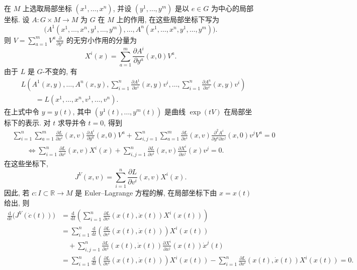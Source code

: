 \begin{RiemannProof}
在 $M$ 上选取局部坐标 $(x^1,\ldots,x^n)$, 并设 $(y^1,\ldots,y^m)$ 是以 $e\in G$ 为中心的局部坐标. 设 $A:G\times M\to M$ 为 $G$ 在 $M$ 上的作用, 在这些局部坐标下写为
\[
  \bigl(A^1(x^1,\ldots,x^n,y^1,\ldots,y^m),\ldots,
         A^n(x^1,\ldots,x^n,y^1,\ldots,y^m)\bigr).
\]
则 $V=\sum_{a=1}^m V^a\frac{\partial}{\partial y^a}$ 的无穷小作用的分量为
\[
  X^i(x)=\sum_{a=1}^m\frac{\partial A^i}{\partial y^a}(x,0)V^a.
\]
由于 $L$ 是 $G$-不变的, 有
\begin{align*}
  &L\left(A^1(x,y),\ldots,A^n(x,y),
    \sum_{i=1}^n\frac{\partial A^1}{\partial x^i}(x,y)v^i,\ldots,
    \sum_{i=1}^n\frac{\partial A^n}{\partial x^i}(x,y)v^i\right)\\
  &\qquad=L(x^1,\ldots,x^n,v^1,\ldots,v^n).
\end{align*}
在上式中令 $y=y(t)$, 其中 $(y^1(t),\ldots,y^m(t))$ 是曲线 $\exp(tV)$ 在局部坐标下的表示. 对 $t$ 求导并令 $t=0$, 得到
\begin{align*}
  &\sum_{i=1}^n\sum_{a=1}^m\frac{\partial L}{\partial x^i}(x,v)
     \frac{\partial A^i}{\partial y^a}(x,0)V^a
  +\sum_{i,j=1}^n\sum_{a=1}^m\frac{\partial L}{\partial v^i}(x,v)
     \frac{\partial^2 A^i}{\partial y^a\partial x^j}(x,0)v^jV^a=0\\
  &\qquad\iff
  \sum_{i=1}^n\frac{\partial L}{\partial x^i}(x,v)X^i(x)
  +\sum_{i,j=1}^n\frac{\partial L}{\partial v^i}(x,v)
     \frac{\partial X^i}{\partial x^j}(x)v^j=0.
\end{align*}
在这些坐标下,
\[
  J^V(x,v)=\sum_{i=1}^n\frac{\partial L}{\partial v^i}(x,v)X^i(x).
\]
因此, 若 $c:I\subset\mathbb{R}\to M$ 是 Euler–Lagrange 方程的解, 在局部坐标下由 $x=x(t)$ 给出, 则
\begin{align*}
  \frac{\mathrm{d}}{\mathrm{d}t}\bigl(J^V(\dot c(t))\bigr)
  &=\frac{\mathrm{d}}{\mathrm{d}t}
      \left(\sum_{i=1}^n\frac{\partial L}{\partial v^i}(x(t),\dot x(t))X^i(x(t))\right)\\
  &=\sum_{i=1}^n\frac{\mathrm{d}}{\mathrm{d}t}
      \left(\frac{\partial L}{\partial v^i}(x(t),\dot x(t))\right)X^i(x(t))\\
  &\quad+\sum_{i,j=1}^n\frac{\partial L}{\partial v^i}(x(t),\dot x(t))
          \frac{\partial X^i}{\partial x^j}(x(t))\dot x^j(t)\\
  &=\sum_{i=1}^n\frac{\mathrm{d}}{\mathrm{d}t}
      \left(\frac{\partial L}{\partial v^i}(x(t),\dot x(t))\right)X^i(x(t))
    -\sum_{i=1}^n\frac{\partial L}{\partial x^i}(x(t),\dot x(t))X^i(x(t))=0.
\end{align*}
\end{RiemannProof}

